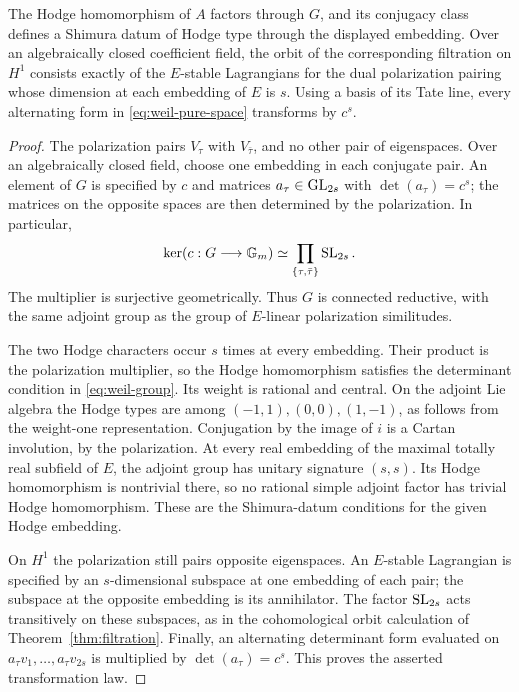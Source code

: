 \begin{lemma}\label{lem:weil-group}
The Hodge homomorphism of $A$ factors through $G$, and its conjugacy
class defines a Shimura datum of Hodge type through the displayed
embedding.  Over an algebraically closed coefficient field, the orbit
of the corresponding filtration on $H^1$ consists exactly of the
$E$-stable Lagrangians for the dual polarization pairing whose
dimension at each embedding of $E$ is $s$.  Using a basis of its Tate
line, every alternating form in \eqref{eq:weil-pure-space} transforms
by $c^s$.
\end{lemma}

\begin{proof}
The polarization pairs $V_\tau$ with $V_{\bar\tau}$, and no other pair
of eigenspaces.  Over an algebraically closed field, choose one
embedding in each conjugate pair.  An element of $G$ is specified by
$c$ and matrices $a_\tau\in\operatorname{GL}_{2s}$ with
$\det(a_\tau)=c^s$; the matrices on the opposite spaces are then
determined by the polarization.  In particular,
\[
 \ker(c:G\longrightarrow\mathbb G_m)
       \simeq\prod_{\{\tau,\bar\tau\}}\operatorname{SL}_{2s}.
\]
The multiplier is surjective geometrically.  Thus $G$ is connected
reductive, with the same adjoint group as the group of $E$-linear
polarization similitudes.

The two Hodge characters occur $s$ times at every embedding.  Their
product is the polarization multiplier, so the Hodge homomorphism
satisfies the determinant condition in \eqref{eq:weil-group}.  Its
weight is rational and central.  On the adjoint Lie algebra the Hodge
types are among $(-1,1),(0,0),(1,-1)$, as follows from the weight-one
representation.  Conjugation by the image of $i$ is a Cartan
involution, by the polarization.  At every real embedding of the
maximal totally real subfield of $E$, the adjoint group has unitary
signature $(s,s)$.  Its Hodge homomorphism is nontrivial there, so no
rational simple adjoint factor has trivial Hodge homomorphism.
These are the Shimura-datum conditions for the given Hodge embedding.

On $H^1$ the polarization still pairs opposite eigenspaces.  An
$E$-stable Lagrangian is specified by an $s$-dimensional subspace at
one embedding of each pair; the subspace at the opposite embedding
is its annihilator.  The factor $\operatorname{SL}_{2s}$ acts transitively on these
subspaces, as in the cohomological orbit calculation of
Theorem~\ref{thm:filtration}.  Finally, an alternating determinant form
evaluated on $a_\tau v_1,\ldots,a_\tau v_{2s}$ is multiplied by
$\det(a_\tau)=c^s$.  This proves the asserted transformation law.
\end{proof}

